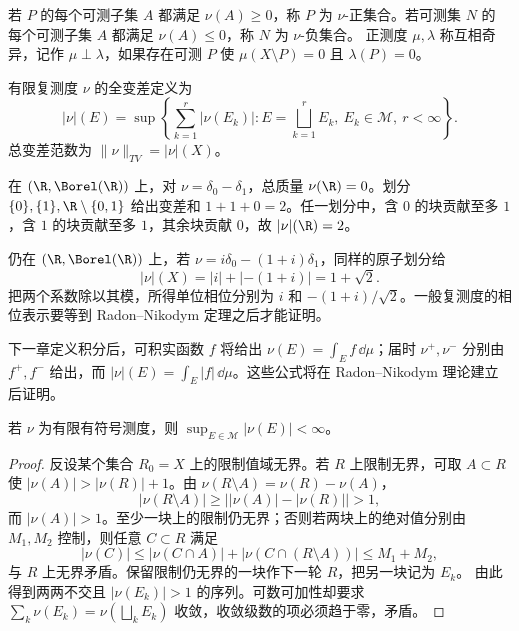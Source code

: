 \begin{definition}[正负集合与互相奇异]\label{def:2-2-3-2}
若 $P$ 的每个可测子集 $A$ 都满足 $\nu(A)\ge0$，称 $P$ 为 $\nu$-正集合。若可测集 $N$ 的
每个可测子集 $A$ 都满足 $\nu(A)\le0$，称 $N$ 为 $\nu$-负集合。
正测度 $\mu,\lambda$ 称互相奇异，记作 $\mu\perp\lambda$，如果存在可测 $P$ 使
$\mu(X\setminus P)=0$ 且 $\lambda(P)=0$。
\end{definition}

\begin{definition}[全变差]\label{def:2-2-3-3}
有限复测度 $\nu$ 的全变差定义为
\[
 |\nu|(E)=\sup\left\{\sum_{k=1}^r|\nu(E_k)|:
 E=\bigsqcup_{k=1}^rE_k,\ E_k\in\mathcal M,\ r<\infty\right\}.
\]
总变差范数为 $\|\nu\|_{TV}=|\nu|(X)$。
\end{definition}

\begin{example}\label{ex:2-2-3-2}
在 $(\R,\Borel(\R))$ 上，对 $\nu=\delta_0-\delta_1$，总质量 $\nu(\R)=0$。划分
$\{0\},\{1\},\R\setminus\{0,1\}$ 给出变差和 $1+1+0=2$。任一划分中，含 $0$ 的块贡献至多
$1$，含 $1$ 的块贡献至多 $1$，其余块贡献 $0$，故 $|\nu|(\R)=2$。
\end{example}

\begin{example}[复相位]\label{ex:2-2-3-3}
仍在 $(\R,\Borel(\R))$ 上，若 $\nu=i\delta_0-(1+i)\delta_1$，同样的原子划分给
\[
 |\nu|(X)=|i|+|-(1+i)|=1+\sqrt2.
\]
把两个系数除以其模，所得单位相位分别为 $i$ 和 $-(1+i)/\sqrt2$。一般复测度的相位表示要等到
Radon--Nikodym 定理之后才能证明。
\end{example}

\begin{remark}[由密度产生的有符号测度]\label{ex:2-2-3-1}
下一章定义积分后，可积实函数 $f$ 将给出
$\nu(E)=\int_Ef\,\dd\mu$；届时
$\nu^+,\nu^-$ 分别由 $f^+,f^-$ 给出，而
$|\nu|(E)=\int_E|f|\,\dd\mu$。这些公式将在 Radon--Nikodym 理论建立后证明。
\end{remark}

\begin{lemma}[有限有符号测度的值域有界]\label{lem:signed-measure-bounded-range}
若 $\nu$ 为有限有符号测度，则 $\sup_{E\in\mathcal M}|\nu(E)|<\infty$。
\end{lemma}

\begin{proof}
反设某个集合 $R_0=X$ 上的限制值域无界。若 $R$ 上限制无界，可取 $A\subset R$ 使
$|\nu(A)|>|\nu(R)|+1$。由
$\nu(R\setminus A)=\nu(R)-\nu(A)$，
\[
 |\nu(R\setminus A)|
 \ge\bigl||\nu(A)|-|\nu(R)|\bigr|>1,
\]
而 $|\nu(A)|>1$。至少一块上的限制仍无界；否则若两块上的绝对值分别由 $M_1,M_2$ 控制，则任意
$C\subset R$ 满足
\[
 |\nu(C)|
 \le|\nu(C\cap A)|+|\nu(C\cap(R\setminus A))|
 \le M_1+M_2,
\]
与 $R$ 上无界矛盾。保留限制仍无界的一块作下一轮 $R$，把另一块记为 $E_k$。
由此得到两两不交且 $|\nu(E_k)|>1$ 的序列。可数可加性却要求
$\sum_k\nu(E_k)=\nu(\bigsqcup_kE_k)$ 收敛，收敛级数的项必须趋于零，矛盾。
\end{proof}

